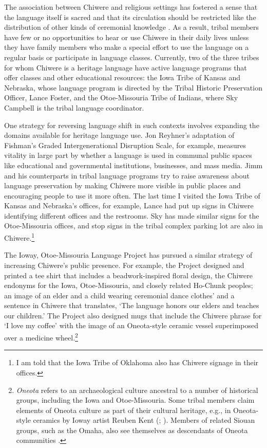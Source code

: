 \documentclass[output=paper]{LSP/langsci}
\begin{document}
The association between Chiwere and religious settings has fostered a sense that the language itself is sacred and that its circulation should be restricted like the distribution of other kinds of ceremonial knowledge \citep{Davidson1997}. As a result, tribal members have few or no opportunities to hear or use Chiwere in their daily lives unless they have family members who make a special effort to use the language on a regular basis or participate in language classes. Currently, two of the three tribes for whom Chiwere is a heritage language have active language programs that offer classes and other educational resources: the Iowa Tribe of Kansas and Nebraska, whose language program is directed by the Tribal Historic Preservation Officer, Lance Foster, and the Otoe-Missouria Tribe of Indians, where Sky Campbell is the tribal language coordinator.

One strategy for reversing language shift in such contexts involves expanding the domains available for heritage language use. Jon Reyhner's \citeyearpar[vii]{Reyhner1999} adaptation of Fishman's \citeyearpar{Fishman1991} Graded Intergenerational Disruption Scale, for example, measures vitality in large part by whether a language is used in communal public spaces like educational and governmental institutions, businesses, and mass media. Jimm and his counterparts in tribal language programs try to raise awareness about language preservation by making Chiwere more visible in public places and encouraging people to use it more often. The last time I visited the Iowa Tribe of Kansas and Nebraska's offices, for example, Lance had put up signs in Chiwere identifying different offices and the restrooms. Sky has made similar signs for the Otoe-Missouria offices, and stop signs in the tribal complex parking lot are also in Chiwere.\footnote{I am told that the Iowa Tribe of Oklahoma also has Chiwere signage in their offices.}

The Ioway, Otoe-Missouria Language Project has pursued a similar strategy of increasing Chiwere's public presence. For example, the Project designed and printed a tee shirt that includes a beadwork-inspired floral design, the Chiwere endonyms for the Iowa, Otoe-Missouria, and closely related Ho-Chunk peoples; an image of an elder and a child wearing ceremonial dance clothes' and a sentence in Chiwere that translates, `The language honors our elders and teaches our children.' The Project also designed mugs that include the Chiwere phrase for `I love my coffee' with the image of an Oneota-style ceramic vessel superimposed over a medicine wheel.\footnote{\emph{Oneota} refers to an archaeological culture ancestral to a number of historical groups, including the Iowa and Otoe-Missouria. Some tribal members claim elements of Oneota culture as part of their cultural heritage, e.g., in Oneota-style ceramics by Ioway artist Reuben Kent (\citeyear{KentND}; \citealt{RundleRundle2007}). Members of related Siouan groups, such as the Omaha, also see themselves as descendants of Oneota communities \citep{Buffalohead2004}.}
\end{document}

